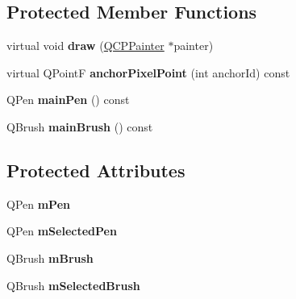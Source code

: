 \subsection*{Protected Member Functions}
\begin{DoxyCompactItemize}
\item 
virtual void {\bfseries draw} (\hyperlink{class_q_c_p_painter}{Q\+C\+P\+Painter} $\ast$painter)\hypertarget{class_q_c_p_item_ellipse_afe97ec827adb05f000fe007783faae3c}{}\label{class_q_c_p_item_ellipse_afe97ec827adb05f000fe007783faae3c}

\item 
virtual Q\+PointF {\bfseries anchor\+Pixel\+Point} (int anchor\+Id) const \hypertarget{class_q_c_p_item_ellipse_ad3c607304dba081e2f778b6a81b903bb}{}\label{class_q_c_p_item_ellipse_ad3c607304dba081e2f778b6a81b903bb}

\item 
Q\+Pen {\bfseries main\+Pen} () const \hypertarget{class_q_c_p_item_ellipse_afc78d49ed5ffa886bccf18f297f83d30}{}\label{class_q_c_p_item_ellipse_afc78d49ed5ffa886bccf18f297f83d30}

\item 
Q\+Brush {\bfseries main\+Brush} () const \hypertarget{class_q_c_p_item_ellipse_a2a9757204877c9d0fd07adfb26d6b1d8}{}\label{class_q_c_p_item_ellipse_a2a9757204877c9d0fd07adfb26d6b1d8}

\end{DoxyCompactItemize}
\subsection*{Protected Attributes}
\begin{DoxyCompactItemize}
\item 
Q\+Pen {\bfseries m\+Pen}\hypertarget{class_q_c_p_item_ellipse_a16ad9389acf028a7e4ac8fd7a550b2e4}{}\label{class_q_c_p_item_ellipse_a16ad9389acf028a7e4ac8fd7a550b2e4}

\item 
Q\+Pen {\bfseries m\+Selected\+Pen}\hypertarget{class_q_c_p_item_ellipse_a57b047abfce6f1a84ed46ca668c90e21}{}\label{class_q_c_p_item_ellipse_a57b047abfce6f1a84ed46ca668c90e21}

\item 
Q\+Brush {\bfseries m\+Brush}\hypertarget{class_q_c_p_item_ellipse_a6fa59478cd3ad1b10e6c1f6cedc84bd6}{}\label{class_q_c_p_item_ellipse_a6fa59478cd3ad1b10e6c1f6cedc84bd6}

\item 
Q\+Brush {\bfseries m\+Selected\+Brush}\hypertarget{class_q_c_p_item_ellipse_a2e49d5547478aa36910ed8a2dcc8a5c0}{}\label{class_q_c_p_item_ellipse_a2e49d5547478aa36910ed8a2dcc8a5c0}

\end{DoxyCompactItemize}
